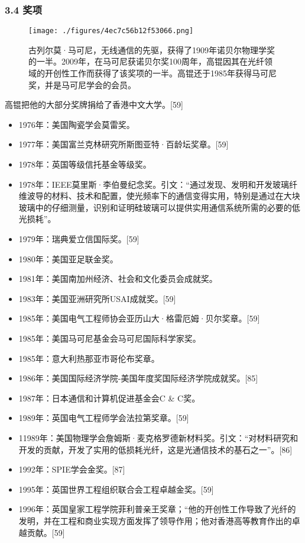 \subsubsection{3.4 奖项}
\begin{figure}[ht]
\centering
\texttt{[image: ./figures/4ec7c56b12f53066.png]}
\caption{古列尔莫·马可尼，无线通信的先驱，获得了1909年诺贝尔物理学奖的一半。2009年，在马可尼获诺贝尔奖100周年，高锟因其在光纤领域的开创性工作而获得了该奖项的一半。高锟还于1985年获得马可尼奖，并是马可尼学会的会员。} \label{fig_GK_3}
\end{figure}
高锟把他的大部分奖牌捐给了香港中文大学。[59]
\begin{itemize}
\item 1976年：美国陶瓷学会莫雷奖。
\item 1977年：美国富兰克林研究所斯图亚特·百龄坛奖章。[59]
\item 1978年：英国等级信托基金等级奖。
\item 1978年：IEEE莫里斯·李伯曼纪念奖。引文：“通过发现、发明和开发玻璃纤维波导的材料、技术和配置，使光频率下的通信变得实用，特别是通过在大块玻璃中的仔细测量，识别和证明硅玻璃可以提供实用通信系统所需的必要的低光损耗”。
\item 1979年：瑞典爱立信国际奖。[59]
\item 1980年：美国亚足联金奖。
\item 1981年：美国南加州经济、社会和文化委员会成就奖。
\item 1983年：美国亚洲研究所USAI成就奖。[59]
\item 1985年：美国电气工程师协会亚历山大·格雷厄姆·贝尔奖章。[59]
\item 1985年：美国马可尼基金会马可尼国际科学家奖。
\item 1985年：意大利热那亚市哥伦布奖章。
\item 1986年：美国国际经济学院-美国年度奖国际经济学院成就奖。[85]
\item 1987年：日本通信和计算机促进基金会C & C奖。
\item 1989年：英国电气工程师学会法拉第奖章。[59]
\item 11989年：美国物理学会詹姆斯·麦克格罗德新材料奖。引文：“对材料研究和开发的贡献，开发了实用的低损耗光纤，这是光通信技术的基石之一”。[86]
\item 1992年：SPIE学会金奖。[87]
\item 1995年：英国世界工程组织联合会工程卓越金奖。[59]
\item 1996年：英国皇家工程学院菲利普亲王奖章；“他的开创性工作导致了光纤的发明，并在工程和商业实现方面发挥了领导作用；他对香港高等教育作出的卓越贡献。[59]

\end{itemize}
